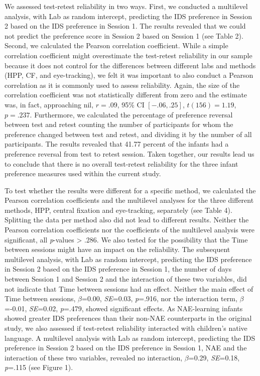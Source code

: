 \documentclass[
  man,floatsintext]{apa6}
\begin{document}
We assessed test-retest reliability in two ways. First, we conducted a multilevel analysis, with Lab as random intercept, predicting the IDS preference in Session 2 based on the IDS preference in Session 1. The results revealed that we could not predict the preference score in Session 2 based on Session 1 (see Table 2). Second, we calculated the Pearson correlation coefficient. While a simple correlation coefficient might overestimate the test-retest reliability in our sample because it does not control for the differences between different labs and methods (HPP, CF, and eye-tracking), we felt it was important to also conduct a Pearson correlation as it is commonly used to assess reliability. Again, the size of the correlation coefficient was not statistically different from zero and the estimate was, in fact, approaching nil, \(r = .09\), 95\% CI \([-.06, .25]\), \(t(156) = 1.19\), \(p = .237\). Furthermore, we calculated the percentage of preference reversal between test and retest counting the number of participants for whom the preference changed between test and retest, and dividing it by the number of all participants. The results revealed that 41.77 percent of the infants had a preference reversal from test to retest session. Taken together, our results lead us to conclude that there is no overall test-retest reliability for the three infant preference measures used within the current study.

To test whether the results were different for a specific method, we calculated the Pearson correlation coefficients and the multilevel analyses for the three different methods, HPP, central fixation and eye-tracking, separately (see Table 4). Splitting the data per method also did not lead to different results. Neither the Pearson correlation coefficients nor the coefficients of the multilevel analysis were significant, all \emph{p}-values \textgreater{} .286.
We also tested for the possibility that the Time between sessions might have an impact on the reliability. The subsequent multilevel analysis, with Lab as random intercept, predicting the IDS preference in Session 2 based on the IDS preference in Session 1, the number of days between Session 1 and Session 2 and the interaction of these two variables, did not indicate that Time between sessions had an effect. Neither the main effect of Time between sessions, \(\beta\)=0.00, \emph{SE}=0.03, \emph{p}=.916, nor the interaction term, \(\beta\)=-0.01, \emph{SE}=0.02, \emph{p}=.479, showed significant effects.
As NAE-learning infants showed greater IDS preferences than their non-NAE counterparts in the original study, we also assessed if test-retest reliability interacted with children's native language. A multilevel analysis with Lab as random intercept, predicting the IDS preference in Session 2 based on the IDS preference in Session 1, NAE and the interaction of these two variables, revealed no interaction, \(\beta\)=0.29, \emph{SE}=0.18, \emph{p}=.115 (see Figure 1).
\end{document}
